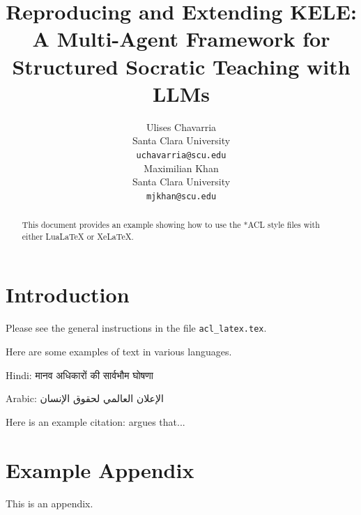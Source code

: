 \documentclass[11pt]{article}
\title{Reproducing and Extending KELE: A Multi-Agent Framework for Structured Socratic Teaching with LLMs}
\author{Ulises Chavarria \\
  Santa Clara University \\
  \texttt{uchavarria@scu.edu} \\\And
  Maximilian Khan \\
  Santa Clara University \\
  \texttt{mjkhan@scu.edu} \\}
\begin{document}
\maketitle
\begin{abstract}
This document provides an example showing how
to use the *ACL style files with either
LuaLaTeX or XeLaTeX.
\end{abstract}


\section{Introduction}

Please see the general instructions
in the file \verb|acl_latex.tex|.

Here are some examples of text in various languages.

Hindi: \foreignlanguage{hindi}{मानव अधिकारों की सार्वभौम घोषणा}

Arabic: \foreignlanguage{arabic}{الإعلان العالمي لحقوق الإنسان}

Here is an example citation:
\citet{Gusfield:97} argues that...




\appendix

\section{Example Appendix}
\label{sec:appendix}

This is an appendix.
\end{document}
